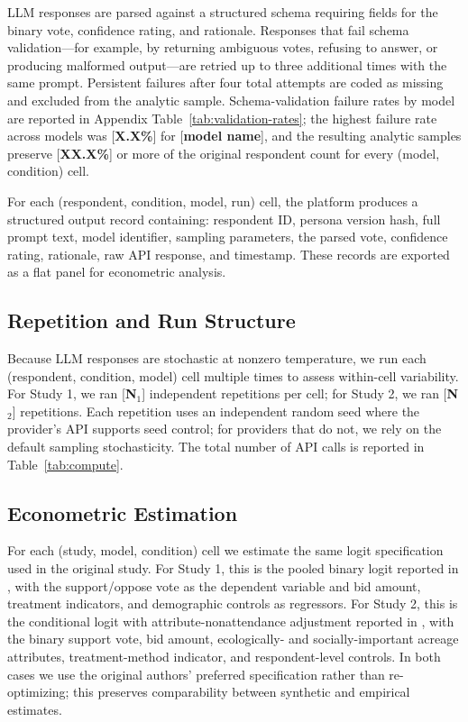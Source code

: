 \documentclass[12pt]{article}
\begin{document}
LLM responses are parsed against a structured schema requiring fields for
the binary vote, confidence rating, and rationale. Responses that fail
schema validation---for example, by returning ambiguous votes, refusing
to answer, or producing malformed output---are retried up to three
additional times with the same prompt. Persistent failures after four
total attempts are coded as missing and excluded from the analytic sample.
Schema-validation failure rates by model are reported in Appendix
Table~\ref{tab:validation-rates}; the highest failure rate across models
was [\textbf{X.X\%}] for [\textbf{model name}], and the resulting analytic
samples preserve [\textbf{XX.X\%}] or more of the original respondent
count for every (model, condition) cell.

For each (respondent, condition, model, run) cell, the platform produces
a structured output record containing: respondent ID, persona version
hash, full prompt text, model identifier, sampling parameters, the parsed
vote, confidence rating, rationale, raw API response, and timestamp.
These records are exported as a flat panel for econometric analysis.

\subsection{Repetition and Run Structure}\label{sec:methods-repetition}

Because LLM responses are stochastic at nonzero temperature, we run each
(respondent, condition, model) cell multiple times to assess within-cell
variability. For Study 1, we ran [\textbf{N$_1$}] independent repetitions
per cell; for Study 2, we ran [\textbf{N$_2$}] repetitions. Each
repetition uses an independent random seed where the provider's API
supports seed control; for providers that do not, we rely on the default
sampling stochasticity. The total number of API calls is reported in
Table~\ref{tab:compute}.

\label{tab:compute}

\subsection{Econometric Estimation}\label{sec:methods-econ}

For each (study, model, condition) cell we estimate the same logit
specification used in the original study. For Study 1, this is the pooled
binary logit reported in \textcite{Aldy2012}, with the support/oppose vote
as the dependent variable and bid amount, treatment indicators, and
demographic controls as regressors. For Study 2, this is the conditional
logit with attribute-nonattendance adjustment reported in
\textcite{Giguere2020}, with the binary support vote, bid amount,
ecologically- and socially-important acreage attributes, treatment-method
indicator, and respondent-level controls. In both cases we use the
original authors' preferred specification rather than re-optimizing; this
preserves comparability between synthetic and empirical estimates.
\end{document}
